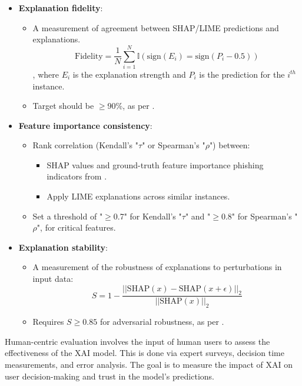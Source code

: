 \begin{itemize}
  \item \textbf{Explanation fidelity}:
  \begin{itemize}
    \item A measurement of agreement between SHAP/LIME predictions and explanations.
    \begin{equation}
      \text{Fidelity} = \frac{1}{N}\sum_{i=1}^N \mathbb{I}(\text{sign}(E_i) = \text{sign}(P_i - 0.5))
    \end{equation}
    , where \(E_i\) is the explanation strength and \(P_i\) is the prediction for the \(i^{th}\) instance.
  \item Target should be \(\geq\)90\%, as per \cite{shendkar2024enhancing}.
  \end{itemize}
  \item \textbf{Feature importance consistency}:
  \begin{itemize}
    \item Rank correlation (Kendall's "\(\tau\)" or Spearman's "\(\rho\)") between:
    \begin{itemize}
      \item SHAP values and ground-truth feature importance phishing indicators from \cite{greco2023explaining}.
      \item Apply LIME explanations across similar instances.
    \end{itemize}
    \item Set a threshold of "\(\geq\)0.7" for Kendall's "\(\tau\)" and "\(\geq\)0.8" for Spearman's "\(\rho\)", for critical features.
  \end{itemize}
  \item \textbf{Explanation stability}:
  \begin{itemize}
    \item A measurement of the robustness of explanations to perturbations in input data:
    \begin{equation}
      S = 1 - \frac{||\text{SHAP}(x) - \text{SHAP}(x + \epsilon)||_2}{||\text{SHAP}(x)||_2}
    \end{equation}
    \item Requires \(S \geq 0.85\) for adversarial robustness, as per \cite{atlam2022business}.
  \end{itemize}
\end{itemize}

\noindent Human-centric evaluation involves the input of human users to assess the effectiveness of the XAI model. This is done via expert surveys, decision time measurements, and error analysis. The goal is to measure the impact of XAI on user decision-making and trust in the model's predictions.

